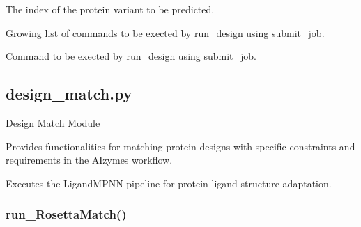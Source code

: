 \documentclass[10pt]{extarticle}
\begin{document}
\par\vspace*{0.5\baselineskip}
{
\begin{description}[noitemsep,topsep=0pt,parsep=0pt,labelwidth=5cm,leftmargin=!,labelindent=0pt,labelsep=0.2cm,itemsep=0pt]
\item[\textcolor{mpgAccentBlue!75!white}{index (str)\dotfill}] The index of the protein variant to be predicted.
\item[\textcolor{mpgAccentBlue!75!white}{cmd (str)\dotfill}] Growing list of commands to be exected by run\_design using submit\_job.
\end{description}
}
\par\vspace*{0.5\baselineskip}
{
\begin{description}[noitemsep,topsep=0pt,parsep=0pt,labelwidth=5cm,leftmargin=!,labelindent=0pt,labelsep=0.2cm,itemsep=0pt]
\item[\textcolor{mpgAccentBlue!75!white}{cmd (str)\dotfill}] Command to be exected by run\_design using submit\_job.
\end{description}
}
\subsection{design\_match.py}
Design Match Module

Provides functionalities for matching protein designs with specific constraints
and requirements in the AIzymes workflow.

\par\vspace*{0.5\baselineskip}
{
\begin{description}[noitemsep,topsep=0pt,parsep=0pt,labelwidth=5cm,leftmargin=!,labelindent=0pt,labelsep=0.2cm,itemsep=0pt]
\item[\textcolor{mpgAccentBlue!75!white}{- prepare\_LigandMPNN\dotfill}] Executes the LigandMPNN pipeline for protein-ligand structure adaptation.
\end{description}
}
\par\vspace*{0.5\baselineskip}
\subsubsection{run\_RosettaMatch()}
\end{document}
